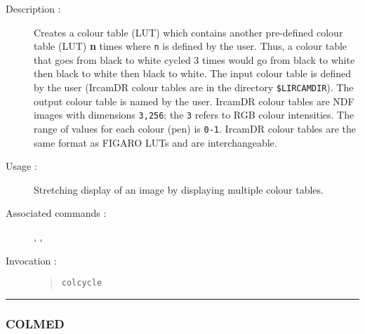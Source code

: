 \begin{description}

\item[Description :] Creates a colour table (LUT) which contains
another pre-defined colour table (LUT) {\bf n} times where {\tt n} is
defined by the user.  Thus, a colour table that goes from black to
white cycled 3 times would go from black to white then black to white
then black to white.  The input colour table is defined by the user
({\sc IrcamDR} colour tables are in the directory {\tt \$LIRCAMDIR}).
The output colour table is named by the user. {\sc IrcamDR} colour
tables are NDF images with dimensions {\tt 3,256}; the {\tt 3} refers
to RGB colour intensities.  The range of values for each colour (pen)
is {\tt 0-1}.  {\sc IrcamDR} colour tables are the same format as
FIGARO LUTs and are interchangeable.

\item[Usage :] Stretching display of an image by displaying multiple colour
tables.

\item[Associated commands :] {\tt {}}, 
{\tt {}}, {\tt {}}

\item[Invocation :]

\begin{quote}{\tt  colcycle }\end{quote}

\end{description}

\hrule 
\subsubsection*{\label{COLMED}COLMED}

